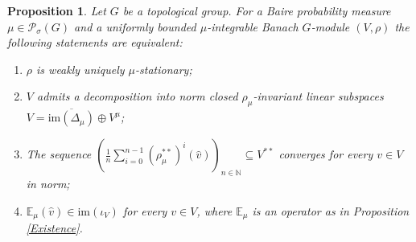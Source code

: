 \documentclass[a4paper,11pt,reqno]{amsart}
\numberwithin{equation}{section}
\newtheorem{proposition}[theorem]{Proposition}
\theoremstyle{definition}
\theoremstyle{remark}
\theoremstyle{remark}
\begin{document}
\begin{proposition} \label{EquivalentCharacterizations} Let $G$ be a topological group. For a Baire probability measure $\mu\in\mathcal{P}_{\sigma}(G)$ and a uniformly bounded $\mu$-integrable Banach $G$-module $(V,\rho)$ the following statements are equivalent: 
\begin{enumerate}
\item $\rho$ is weakly uniquely $\mu$-stationary; 
\item $V$ admits a decomposition into norm closed $\rho_{\mu}$-invariant linear subspaces \emph{$V=\overline{\text{im}(\Delta_{\mu})}\oplus V^{\mu}$}; 
\item The sequence $\left(\frac{1}{n}\sum_{i=0}^{n-1}(\rho_{\mu}^{\ast\ast})^{i}(\widehat{v})\right)_{n\in\mathbb{N}}\subseteq V^{\ast\ast}$ converges for every $v\in V$ in norm; 
\item \emph{$\mathbb{E}_{\mu}(\widehat{v})\in\text{im}(\iota_{V})$} for every $v\in V$, where $\mathbb{E}_{\mu}$ is an operator as in Proposition \ref{Existence}. 
\end{enumerate}
\end{proposition}
\end{document}
